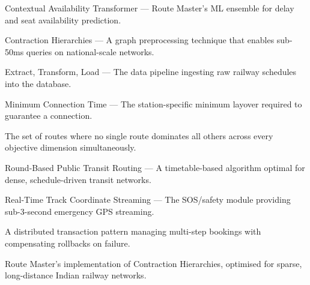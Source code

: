 \documentclass[12pt,a4paper]{report}
\begin{document}
\begin{description}[leftmargin=2em, style=nextline]
  \item[CAT] Contextual Availability Transformer --- Route Master's ML ensemble for delay and seat availability prediction.
  \item[CH] Contraction Hierarchies --- A graph preprocessing technique that enables sub-50ms queries on national-scale networks.
  \item[ETL] Extract, Transform, Load --- The data pipeline ingesting raw railway schedules into the database.
  \item[MCT] Minimum Connection Time --- The station-specific minimum layover required to guarantee a connection.
  \item[Pareto Frontier] The set of routes where no single route dominates all others across every objective dimension simultaneously.
  \item[RAPTOR] Round-Based Public Transit Routing --- A timetable-based algorithm optimal for dense, schedule-driven transit networks.
  \item[RTCS] Real-Time Track Coordinate Streaming --- The SOS/safety module providing sub-3-second emergency GPS streaming.
  \item[Saga Pattern] A distributed transaction pattern managing multi-step bookings with compensating rollbacks on failure.
  \item[TurboRouter] Route Master's implementation of Contraction Hierarchies, optimised for sparse, long-distance Indian railway networks.
\end{description}
\end{document}
